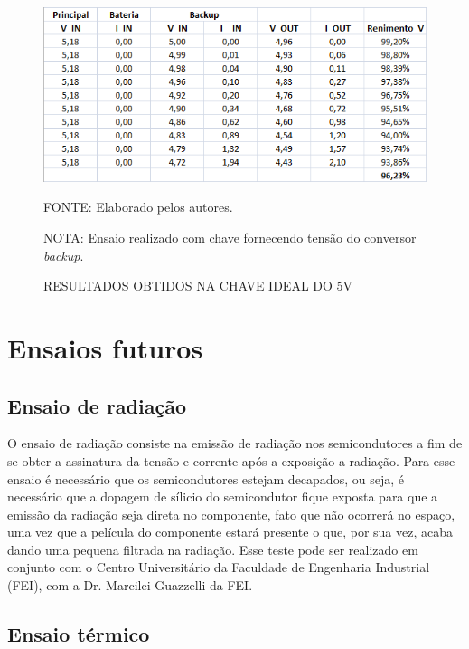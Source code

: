 \documentclass[
	12pt,				%
	openright,			%
	oneside,			%
	a4paper,			%
	english,			%
	french,				%
	spanish,			%
	brazil,				%
	oldfontcommands
	]{abntex2}
\begin{document}
\begin{apendicesenv}
	\begin{figure}[th]
		\caption{RESULTADOS OBTIDOS NA CHAVE IDEAL DO 5V}
		\centering
		\includegraphics[width=0.75\linewidth]{./anexos/chaveb}
		
		\begin{small}
			FONTE: Elaborado pelos autores.
		\end{small}	
		
		\begin{footnotesize}
		NOTA: Ensaio realizado com chave fornecendo tensão do conversor \textit{backup}.
		\end{footnotesize}
	\end{figure}
	
\chapter[Ensaios futuros]{Ensaios futuros}\label{ensaios}
	
\section[Ensaio de radiação]{Ensaio de radiação}	

	O ensaio de radiação consiste na emissão de radiação nos semicondutores a fim de se obter a assinatura da tensão e corrente após a exposição a radiação. Para esse ensaio é necessário que os semicondutores estejam decapados, ou seja, é necessário que a dopagem de sílicio do semicondutor fique exposta para que a emissão da radiação seja direta no componente, fato que não ocorrerá no espaço, uma vez que a película do componente estará presente o que, por sua vez, acaba dando uma pequena filtrada na radiação. Esse teste pode ser realizado em conjunto com o Centro Universitário da Faculdade de Engenharia Industrial (FEI), com a Dr. Marcilei Guazzelli da FEI.	
	
\section[Ensaio térmico]{Ensaio térmico}


\end{apendicesenv}
\end{document}

